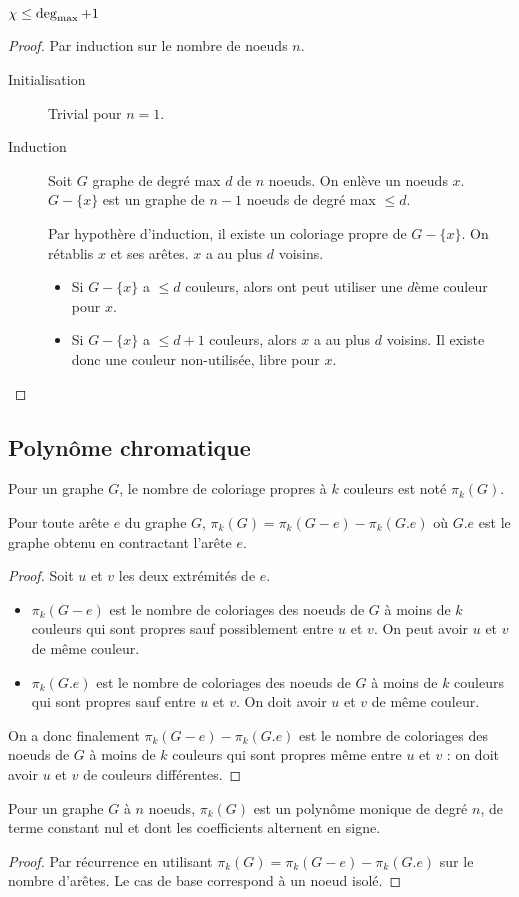 \begin{mytheo}
  $\chi \leq \deg_{\mathrm{max}} + 1$
  \begin{proof}
    Par induction sur le nombre de noeuds $n$.
    \begin{description}
      \item[Initialisation]
        Trivial pour $n = 1$.
      \item[Induction]
        Soit $G$ graphe de degré max $d$ de $n$ noeuds. On enlève un noeuds $x$. $G-\{x\}$ est un graphe de $n-1$ noeuds de degré max $\leq d$.

        Par hypothère d'induction, il existe un coloriage propre de $G-\{x\}$.
        On rétablis $x$ et ses arêtes. $x$ a au plus $d $ voisins.

        \begin{itemize}
          \item Si  $G-\{x\}$ a $\leq d$ couleurs, alors ont peut utiliser une $d$ème couleur pour $x$.
          \item  Si $G-\{x\}$ a $\leq d+1$ couleurs, alors $x$ a au plus $d$ voisins. Il existe donc une couleur non-utilisée, libre pour $x$.
        \end{itemize}
    \end{description}
  \end{proof}
\end{mytheo}
\subsection{Polynôme chromatique}
Pour un graphe $G$, le nombre de coloriage propres à $k$ couleurs est noté $\pi_k(G)$.
\begin{mytheo}
  Pour toute arête $e$ du graphe $G$, $\pi_k(G) = \pi_k(G-e) - \pi_k(G.e)$ où $G.e$ est le graphe obtenu en contractant l'arête $e$.
  \begin{proof}
  Soit $u$ et $v$ les deux extrémités de $e$.
	\begin{itemize}
	\item $\pi_k(G-e)$ est le nombre de coloriages des noeuds de $G$ à moins de $k$ couleurs qui sont propres sauf possiblement entre $u$ et $v$. On peut avoir $u$ et $v$ de même couleur.
	\item $\pi_k(G.e)$ est le nombre de coloriages des noeuds de $G$ à moins de $k$ couleurs qui sont propres sauf entre $u$ et $v$. On doit avoir $u$ et $v$ de même couleur.
	\end{itemize}
	On a donc finalement $\pi_k(G-e) - \pi_k(G.e)$ est le nombre de coloriages des noeuds de $G$ à moins de $k$ couleurs qui sont propres même entre $u$ et $v$ : on doit avoir $u$ et $v$ de couleurs différentes.
  \end{proof}
\end{mytheo}

\begin{mycorr} [Birkhoff]
  Pour un graphe $G$ à $n$ noeuds, $\pi_k (G)$ est un polynôme monique de degré $n$, de terme constant nul et dont les coefficients alternent en signe.
  \begin{proof}
    Par récurrence en utilisant $\pi_k(G) = \pi_k(G-e)-\pi_k(G.e)$ sur le nombre d'arêtes. Le cas de base correspond à un noeud isolé.
  \end{proof}
\end{mycorr}
